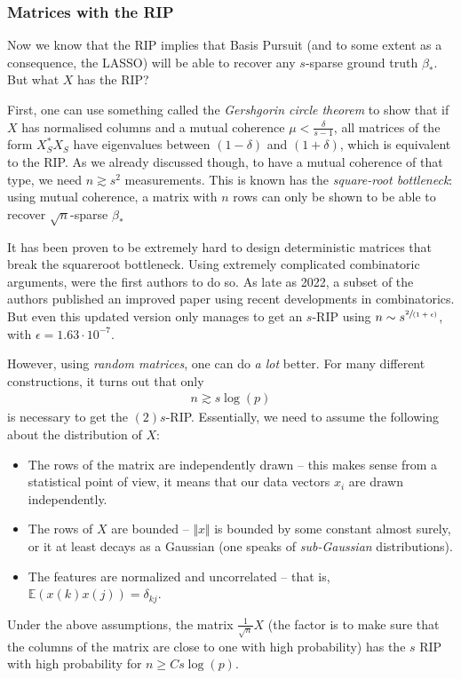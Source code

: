 \documentclass{article}
\newcommand{\norm}[1]{\Vert #1 \Vert}
\begin{document}
\subsubsection{Matrices with the RIP}
Now we know that the RIP implies that Basis Pursuit (and to some extent as a consequence, the LASSO) will be able to recover any $s$-sparse ground truth $\beta_*$. But what $X$ has the RIP?

First, one can use something called the \emph{Gershgorin circle theorem} to show that if $X$ has normalised columns and a mutual coherence $\mu < \tfrac{\delta}{s-1}$, all matrices of the form $X_S^*X_S$  have eigenvalues between $(1-\delta)$ and $(1+\delta)$, which is equivalent to the RIP. As we already discussed though, to have a mutual coherence of that type, we need $n\gtrsim s^2$ measurements. This is known has the \emph{square-root bottleneck}: using mutual coherence, a matrix with $n$ rows can only be shown to be able to recover $\sqrt{n}$-sparse $\beta_*$

It has been proven to be extremely hard to design deterministic matrices that break the squareroot bottleneck. Using extremely complicated combinatoric arguments, \cite{bourgain2011explicit} were the first authors to do so. As late as 2022, a subset of the authors published an improved paper \cite{ford2022explicit} using recent developments in combinatorics. But even this updated version only manages to get an $s$-RIP using $n\sim s^{\sfrac{2}{(1+\epsilon)}}$, with $\epsilon=1.63\cdot 10^{-7}$.

However, using \emph{random matrices}, one can do \emph{a lot} better. For many different constructions, it turns out that only 
\begin{align*}
    n \gtrsim s\log(p)
\end{align*}
is necessary to get the $(2)s$-RIP. Essentially, we need to assume the following about the distribution of $X$:
\begin{itemize}
    \item The rows of the matrix are independently drawn -- this makes sense from a statistical point of view, it means that our data vectors $x_i$ are drawn independently.
    \item The rows of $X$ are bounded -- $\norm{x}$ is bounded by some constant almost surely, or it at least decays as a Gaussian (one speaks of \emph{sub-Gaussian} distributions).
    \item The features are normalized and uncorrelated -- that is, $\mathbb{E}(x(k)x(j))=\delta_{kj}$.
\end{itemize}
Under the above assumptions, the matrix $\tfrac{1}{\sqrt{n}}X$ (the factor is to make sure that the columns of the matrix are close to one with high probability) has the $s$ RIP with high probability for $n \geq C s\log(p)$.
\end{document}
